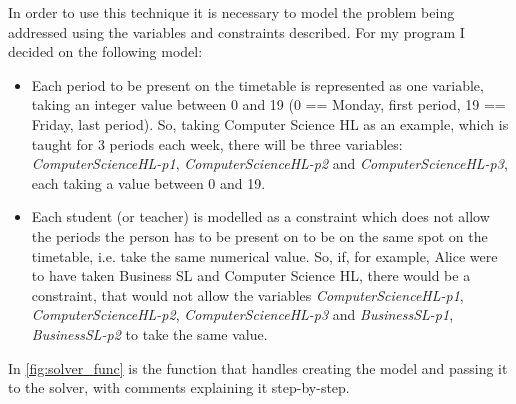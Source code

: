 \documentclass[12pt]{article}
\begin{document}
In order to use this technique it is necessary to model the problem being addressed using
the variables and constraints described. For my program I decided on the following model:
%
\begin{itemize}
    \item Each period to be present on the timetable is represented as one variable, taking
        an integer value between 0 and 19 (0 == Monday, first period, 19 == Friday, last
        period). So, taking Computer Science HL as an example, which is taught for 3 periods
        each week, there will be three variables: \textit{ComputerScienceHL-p1},
        \textit{ComputerScienceHL-p2} and \textit{ComputerScienceHL-p3}, each taking a value
        between 0 and 19.

    \item Each student (or teacher) is modelled as a constraint which does not allow the
        periods the person has to be present on to be on the same spot on the timetable,
        i.e. take the same numerical value. So, if, for example, Alice were to have taken
        Business SL and Computer Science HL, there would be a constraint, that would not
        allow the variables \textit{ComputerScienceHL-p1}, \textit{ComputerScienceHL-p2},
        \textit{ComputerScienceHL-p3} and \textit{BusinessSL-p1}, \textit{BusinessSL-p2} to
        take the same value.
\end{itemize}
%

In \autoref{fig:solver_func} is the function that handles creating the model and passing it
to the solver, with comments explaining it step-by-step.

\begin{figure}[H]
    \caption{}
    \inputminted{python}{solver_listing.py}
    \label{fig:solver_func}
\end{figure}

\printbibliography[type={software},title={Libraries}]
\printbibliography[type={online}, title={References}]
\end{document}
